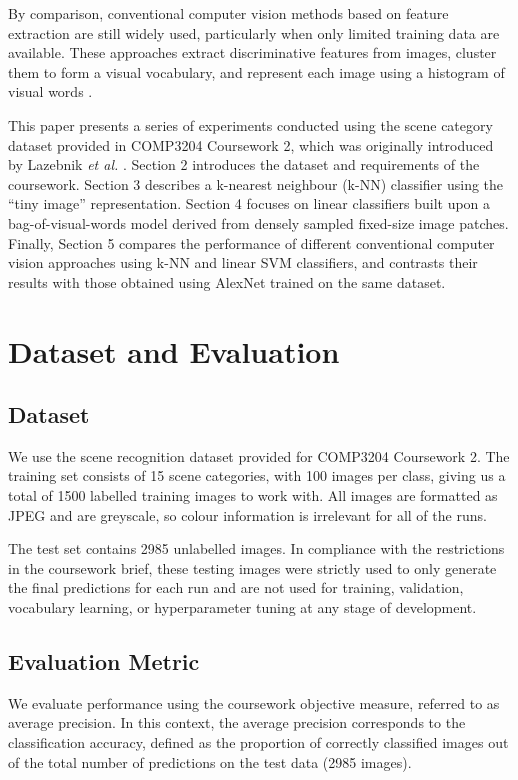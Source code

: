 \documentclass[10pt,twocolumn,letterpaper]{article}
\begin{document}
By comparison, conventional computer vision methods based on feature extraction are still widely used, particularly when only limited training data are available. These approaches extract discriminative features from images, cluster them to form a visual vocabulary, and represent each image using a histogram of visual words \cite{csurka2004visual}.

This paper presents a series of experiments conducted using the scene category dataset provided in COMP3204 Coursework 2, which was originally introduced by Lazebnik \textit{et al.} \cite{lazebnik2006beyond}. Section 2 introduces the dataset and requirements of the coursework. Section 3 describes a k-nearest neighbour (k-NN) classifier using the “tiny image” representation. Section 4 focuses on linear classifiers built upon a bag-of-visual-words model derived from densely sampled fixed-size image patches. Finally, Section 5 compares the performance of different conventional computer vision approaches using k-NN and linear SVM classifiers, and contrasts their results with those obtained using AlexNet trained on the same dataset.

\section{Dataset and Evaluation}

\subsection{Dataset}
We use the scene recognition dataset provided for COMP3204 Coursework 2. The training set consists of 15 scene categories, with 100 images per class, giving us a total of 1500 labelled training images to work with. All images are formatted as JPEG and are greyscale, so colour information is irrelevant for all of the runs.

The test set contains 2985 unlabelled images. In compliance with the restrictions in the coursework brief, these testing images were strictly used to only generate the final predictions for each run and are not used for training, validation, vocabulary learning, or hyperparameter tuning at any stage of development.

\subsection{Evaluation Metric}
We evaluate performance using the coursework objective measure, referred to as average precision. In this context, the average precision corresponds to the classification accuracy, defined as the proportion of correctly classified images out of the total number of predictions on the test data (2985 images).
\end{document}
